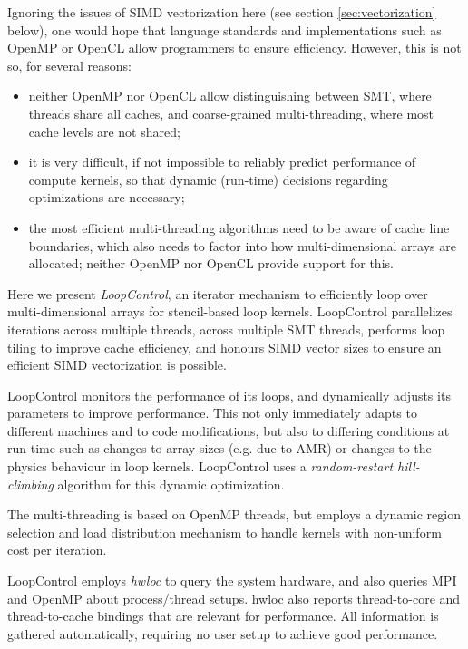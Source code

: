 \documentclass[conference]{IEEEtran}
\begin{document}
Ignoring the issues of SIMD vectorization here (see section
\ref{sec:vectorization} below), one would hope that language standards
and implementations such as OpenMP or OpenCL allow programmers
to ensure efficiency. However, this is not so, for several reasons:
\begin{itemize}
  \item neither OpenMP nor OpenCL allow distinguishing between SMT,
    where threads share all caches, and coarse-grained multi-threading,
    where most cache levels are not shared;
  \item it is very difficult, if not impossible to reliably predict
    performance of compute kernels, so that dynamic (run-time)
    decisions regarding optimizations are necessary;
  \item the most efficient multi-threading algorithms need to be aware
    of cache
    line boundaries, which also needs to factor into how
    multi-dimensional arrays are allocated; neither OpenMP nor OpenCL
    provide support for this.
\end{itemize}

Here we present \emph{LoopControl}, an iterator mechanism to
efficiently loop over multi-dimensional arrays for stencil-based loop
kernels. LoopControl parallelizes iterations across multiple
threads, across multiple SMT threads, performs loop
tiling to improve cache efficiency, and honours SIMD vector sizes to
ensure an efficient SIMD vectorization is possible.

LoopControl monitors the performance of
its loops, and dynamically adjusts its parameters to improve
performance. This not only immediately adapts to different machines
and to code
modifications, but also to differing conditions at run time such as
changes to array sizes (e.g. due to AMR) or changes to the physics
behaviour in loop kernels. LoopControl uses a \emph{random-restart
  hill-climbing} algorithm for this dynamic optimization.

The multi-threading is based on OpenMP threads, but employs a dynamic
region selection and load distribution mechanism to handle kernels
with non-uniform cost per iteration.

LoopControl employs \emph{hwloc} \cite{hwlocweb} to query the system
hardware, and also queries MPI and OpenMP about process/thread setups.
hwloc also reports thread-to-core and thread-to-cache
bindings that are relevant for performance. All information is
gathered automatically, requiring no user setup to achieve good
performance.
\end{document}
